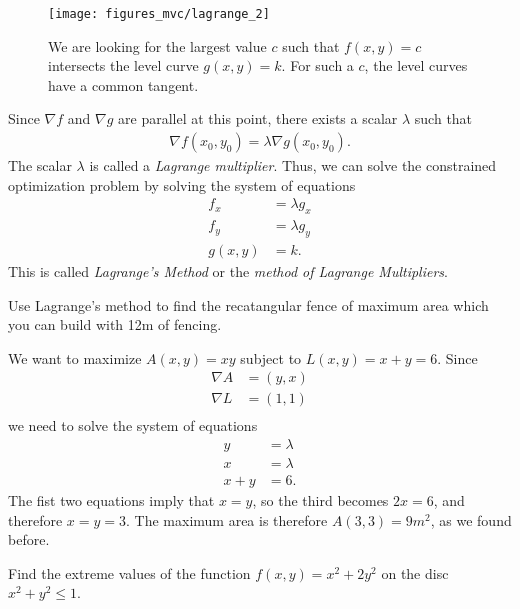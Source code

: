 \documentclass[12pt,letterpaper,reqno]{article}
\numberwithin{equation}{section}
\begin{document}
{\begin{figure}[h]
	\centering
	\texttt{[image: figures\_mvc/lagrange\_2]}
	\caption{We are looking for the largest value $c$ such that $f(x,y)=c$ intersects the level curve $g(x,y)=k$. For such a $c$, the level curves have a common tangent.}
\end{figure}


 Since $\nabla f$ and $\nabla g$ are parallel at this point, there exists a scalar $\lambda$ such that
\begin{align*}
	\nabla f(x_0,y_0)=\lambda \nabla g(x_0,y_0).
\end{align*}
The scalar $\lambda$ is called a \emph{Lagrange multiplier}. Thus, we can solve the constrained optimization problem by solving the system of equations
\begin{align*}
	f_x&=\lambda g_x \\
	f_y&=\lambda g_y \\
	g(x,y)&=k.
\end{align*}
This is called \emph{Lagrange's Method} or the \emph{method of Lagrange Multipliers}.

\newpage

\begin{example}
Use Lagrange's method to find the recatangular fence of maximum area which you can build with 12m of fencing.	
\end{example}

\begin{solution}
We want to maximize $A(x,y)=xy$ subject to $L(x,y)=x+y=6$. Since 
\begin{align*}
	\nabla A&=(y,x) \\
	\nabla L&=(1,1) \\
	\end{align*}
	we need to solve the system of equations
	\begin{align*}
	y&=\lambda \\
	x&=\lambda \\
	x+y&=6.
	\end{align*}
	The fist two equations imply that $x=y$, so the third becomes $2x=6$, and therefore $x=y=3$. The maximum area is therefore $A(3,3)=9m^2$, as we found before.
\end{solution}

\begin{example}
Find the extreme values of the function $f(x,y)=x^2+2y^2$ on the disc $x^2+y^2 \leq 1$.	
\end{example}

}
\end{document}
